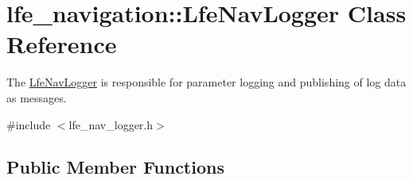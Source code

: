 \hypertarget{classlfe__navigation_1_1LfeNavLogger}{}\section{lfe\+\_\+navigation\+:\+:Lfe\+Nav\+Logger Class Reference}
\label{classlfe__navigation_1_1LfeNavLogger}


The \hyperlink{classlfe__navigation_1_1LfeNavLogger}{Lfe\+Nav\+Logger} is responsible for parameter logging and publishing of log data as messages.  




{\ttfamily \#include $<$lfe\+\_\+nav\+\_\+logger.\+h$>$}

\subsection*{Public Member Functions}
